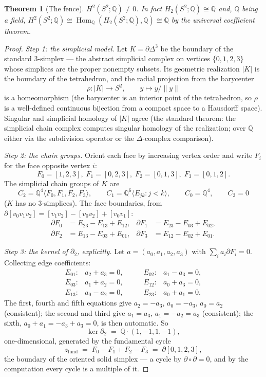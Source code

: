\documentclass[11pt,a4paper]{article}
\theoremstyle{plain}
\newtheorem{theorem}{Theorem}[section]
\theoremstyle{definition}
\newcommand{\Q}{\mathbb{Q}}
\newcommand{\Hom}{\operatorname{Hom}}
\begin{document}
\begin{theorem}[The fence]\label{thm:sphere-h2}
$H^2(S^2;\Q) \ne 0$.  In fact $H_2(S^2;\Q) \cong \Q$ and, $\Q$
being a field, $H^2(S^2;\Q) \cong \Hom_\Q(H_2(S^2;\Q), \Q) \cong \Q$
by the universal coefficient theorem.
\end{theorem}

\begin{proof}
\emph{Step 1: the simplicial model.}  Let $K = \partial\Delta^3$ be
the boundary of the standard $3$-simplex --- the abstract simplicial
complex on vertices $\{0,1,2,3\}$ whose simplices are the proper
nonempty subsets.  Its geometric realization $|K|$ is the boundary of
the tetrahedron, and the radial projection from the barycenter
\[
\rho : |K| \to S^2, \qquad y \mapsto y/\|y\|
\]
is a homeomorphism (the barycenter is an interior point of the
tetrahedron, so $\rho$ is a well-defined continuous bijection from a
compact space to a Hausdorff space).  Singular and simplicial
homology of $|K|$ agree (the standard theorem: the simplicial chain
complex computes singular homology of the realization; over $\Q$
either via the subdivision operator or the $\Delta$-complex
comparison).

\emph{Step 2: the chain groups.}  Orient each face by increasing
vertex order and write $F_i$ for the face opposite vertex $i$:
\[
F_0 = [1,2,3],\; F_1 = [0,2,3],\; F_2 = [0,1,3],\; F_3 = [0,1,2].
\]
The simplicial chain groups of $K$ are
\[
C_2 = \Q^4\langle F_0,F_1,F_2,F_3\rangle, \qquad
C_1 = \Q^6\langle E_{jk} : j < k \rangle, \qquad
C_0 = \Q^4, \qquad C_3 = 0
\]
($K$ has no $3$-simplices).  The face boundaries, from
$\partial[v_0v_1v_2] = [v_1v_2] - [v_0v_2] + [v_0v_1]$:
\[
\begin{aligned}
\partial F_0 &= E_{23} - E_{13} + E_{12}, &
\partial F_1 &= E_{23} - E_{03} + E_{02},\\
\partial F_2 &= E_{13} - E_{03} + E_{01}, &
\partial F_3 &= E_{12} - E_{02} + E_{01} .
\end{aligned}
\]

\emph{Step 3: the kernel of $\partial_2$, explicitly.}  Let $a =
(a_0,a_1,a_2,a_3)$ with $\sum_i a_i \partial F_i = 0$.  Collecting
edge coefficients:
\[
\begin{array}{llll}
E_{01}: & a_2 + a_3 = 0, \qquad & E_{02}: & a_1 - a_3 = 0,\\
E_{03}: & a_1 + a_2 = 0, \qquad & E_{12}: & a_0 + a_3 = 0,\\
E_{13}: & a_0 - a_2 = 0, \qquad & E_{23}: & a_0 + a_1 = 0 .
\end{array}
\]
The first, fourth and fifth equations give $a_2 = -a_3$, $a_0 =
-a_3$, $a_0 = a_2$ (consistent); the second and third give $a_1 =
a_3$, $a_1 = -a_2 = a_3$ (consistent); the sixth, $a_0 + a_1 = -a_3
+ a_3 = 0$, is then automatic.  So
\[
\ker \partial_2 \;=\; \Q \cdot (1, -1, 1, -1),
\]
one-dimensional, generated by the fundamental cycle
\[
z_{\mathrm{fund}} \;=\; F_0 - F_1 + F_2 - F_3 \;=\;
\partial [0,1,2,3],
\]
the boundary of the oriented solid simplex --- a cycle by $\partial
\circ \partial = 0$, and by the computation every cycle is a
multiple of it.


\end{proof}
\end{document}
